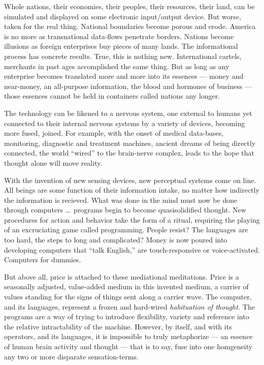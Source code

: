Whole nations, their economies, their peoples, their resources, their land, can be simulated and
displayed on some electronic input/output device. But worse, taken for the real thing. National
boundaries become porous and erode. America is no more as trans\-national data-flows penetrate
borders. Nations become illusions as foreign enterprises buy pieces of many lands. The informational
process has concrete results. True, this is nothing new. International cartels, merchants in past
ages accomplished the same thing. But as long as any enterprise becomes translated more and more
into its essences --- money and near-money, an all-purpose information, the blood and hormones of
business --- those essences cannot be held in containers called nations any longer. 

The technology can be likened to a nervous system, one external to humans yet connected to their
internal nervous systems by a variety of devices, becoming more fused, joined. For example, with the
onset of medical data-bases, monitoring, diagnostic and treatment machines, ancient dreams of being
directly connected, the world \enquote{wired} to the brain-nerve complex, leads to the hope that
thought alone will move reality. 

With the invention of new sensing devices, new perceptual systems come on line. All beings are some
function of their information intake, no matter how indirectly the information is recieved. What was
done in the mind must now be done through computers \ldots\ programs begin to become quasisolidified
thought. New procedures for action and behavior take the form of a ritual, requiring the playing of
an excruciating game called programming. People resist? The languages are too hard, the steps to
long and complicated? Money is now poured into developing computers that \enquote{talk English,} are
touch-responsive or voice-activated. Computers for dummies. 

But above all, price is attached to these mediational meditations. Price is a seasonally adjusted,
value-added medium in this invented medium, a carrier of values standing for the signs of things
sent along a carrier wave. The computer, and its languages, represent a frozen and hard-wired
\emph{habituation of thought.} The programs are a way of trying to introduce flexibility, variety
and reference into the relative intractability of the machine. However, by itself, and with its
operators, and its languages, it is impossible to truly metaphorize --- an essence of human brain
activity and thought --- that is to say, fuse into one homgeneity any two or more disparate
sensation-terms. 

